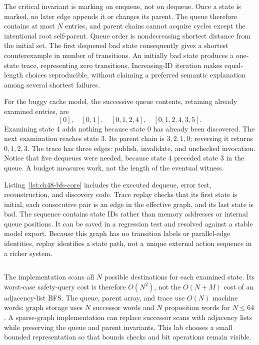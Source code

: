 The critical invariant is marking on enqueue, not on dequeue.
Once a state is marked, no later edge appends it or changes its parent.
The queue therefore contains at most $N$ entries, and parent chains cannot acquire cycles except the intentional root self-parent.
Queue order is nondecreasing shortest distance from the initial set.
The first dequeued bad state consequently gives a shortest counterexample in number of transitions.
An initially bad state produces a one-state trace, representing zero transitions.
Increasing-ID iteration makes equal-length choices reproducible, without claiming a preferred semantic explanation among several shortest failures.

For the buggy cache model, the successive queue contents, retaining already examined entries, are
\[
  [0],\quad [0,1],\quad [0,1,2,4],\quad [0,1,2,4,3,5].
\]
Examining state 4 adds nothing because state 0 has already been discovered.
The next examination reaches state 3.
Its parent chain is $3,2,1,0$; reversing it returns $0,1,2,3$.
The trace has three edges: publish, invalidate, and unchecked invocation.
Notice that five dequeues were needed, because state 4 preceded state 3 in the queue.
A budget measures work, not the length of the eventual witness.

Listing~\ref{lst:ch48-bfs-core} includes the executed dequeue, error test, reconstruction, and discovery code.
Trace replay checks that its first state is initial, each consecutive pair is an edge in the effective graph, and its last state is bad.
The sequence contains state IDs rather than memory addresses or internal queue positions.
It can be saved in a regression test and resolved against a stable model export.
Because this graph has no transition labels or parallel-edge identities, replay identifies a state path, not a unique external action sequence in a richer system.

\begin{listing}[htbp]
  \inputminted[firstline=109,lastline=135]{c}{example-code/model-checker/checker.c}
  \caption{The BFS core publishes a trace only when it has reached a bad state.}
  \label{lst:ch48-bfs-core}
\end{listing}

The implementation scans all $N$ possible destinations for each examined state.
Its worst-case safety-query cost is therefore $O(N^2)$, not the $O(N+M)$ cost of an adjacency-list BFS.
The queue, parent array, and trace use $O(N)$ machine words; graph storage uses $N$ successor words and $N$ proposition words for $N\leq64$.
A sparse-graph implementation can replace successor scans with adjacency lists while preserving the queue and parent invariants.
This lab chooses a small bounded representation so that bounds checks and bit operations remain visible.

